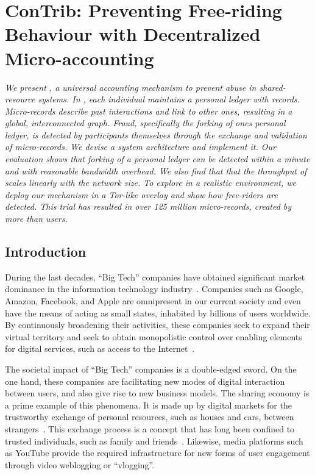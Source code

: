 \chapter{ConTrib: Preventing Free-riding Behaviour with Decentralized Micro-accounting}
\label{chapter2}

\emph{We present \ModelName{}, a universal accounting mechanism to prevent abuse in shared-resource systems.
In \ModelName{}, each individual maintains a personal ledger with \emph{records}.
Micro-records describe past interactions and link to other ones, resulting in a global, interconnected graph.
Fraud, specifically the forking of ones personal ledger, is detected by participants themselves through the exchange and validation of micro-records.
We devise a system architecture and implement it.
Our evaluation shows that forking of a personal ledger can be detected within a minute and with reasonable bandwidth overhead.
We also find that that the throughput of \ModelName{} scales linearly with the network size.
To explore \ModelName{} in a realistic environment, we deploy our mechanism in a Tor-like overlay and show how free-riders are detected.
This trial has resulted in over 125 million micro-records, created by more than \TrialUsers{} users.}

\newpage

\section{Introduction}

During the last decades, \enquote{Big Tech} companies have obtained significant market dominance in the information technology industry~\cite{frost2019bigtech}.
Companies such as Google, Amazon, Facebook, and Apple are omnipresent in our current society and even have the means of acting as small states, inhabited by billions of users worldwide.
By continuously broadening their activities, these companies seek to expand their virtual territory and seek to obtain monopolistic control over enabling elements for digital services, such as access to the Internet~\cite{best2014internet}.

The societal impact of \enquote{Big Tech} companies is a double-edged sword.
On the one hand, these companies are facilitating new modes of digital interaction between users, and also give rise to new business models.
The sharing economy is a prime example of this phenomena.
It is made up by digital markets for the trustworthy exchange of personal resources, such as houses and cars, between strangers~\cite{schor2016debating}.
This exchange process is a concept that has long been confined to trusted individuals, such as family and friends~\cite{frenken2019putting}.
Likewise, media platforms such as YouTube provide the required infrastructure for new forms of user engagement through video weblogging or \enquote{vlogging}.

